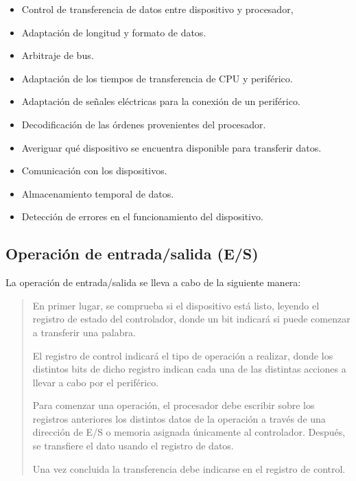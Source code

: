 \documentclass[a4paper, 11pt, titlepage]{article}
\begin{document}
        \begin{itemize}
            \item Control de transferencia de datos entre dispositivo y procesador,
            \item Adaptación de longitud y formato de datos.
            \item Arbitraje de bus.
            \item Adaptación de los tiempos de transferencia de CPU y periférico.
            \item Adaptación de señales eléctricas para la conexión de un periférico.
            \item Decodificación de las órdenes provenientes del procesador.
            \item Averiguar qué dispositivo se encuentra disponible para transferir datos.
            \item Comunicación con los dispositivos.
            \item Almacenamiento temporal de datos.
            \item Detección de errores en el funcionamiento del dispositivo.
        \end{itemize}

    \subsection{Operación de entrada/salida (E/S)}

        La operación de entrada/salida se lleva a cabo de la siguiente manera:

        \begin{quote}
            \small En primer lugar, se comprueba si el dispositivo está listo, leyendo el registro 
            de estado del controlador, donde un bit indicará si puede comenzar a transferir una palabra.

            El registro de control indicará el tipo de operación a realizar, donde los distintos bits de 
            dicho registro indican cada una de las distintas acciones a llevar a cabo por el 
            periférico.

            Para comenzar una operación, el procesador debe escribir sobre los registros anteriores los 
            distintos datos de la operación a través de una dirección de E/S o memoria asignada únicamente 
            al controlador. Después, se transfiere el dato usando el registro de datos.

            Una vez concluida la transferencia debe indicarse en el registro de control.
        \end{quote}
\end{document}
